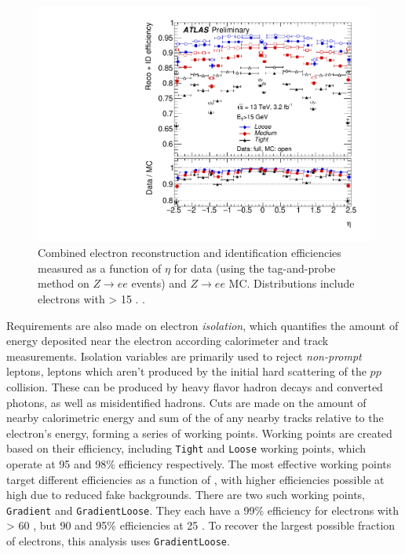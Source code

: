 \begin{centering}
\begin{figure}[!hbt]
\myfloatalign
\includegraphics[width=.90\linewidth]{figures/reco/fig_14b.pdf}
\caption{ Combined electron reconstruction and identification efficiencies measured as a function of $\eta$ for data (using the tag-and-probe method on $Z\rightarrow ee$ events) and $Z\rightarrow ee$ \ac{MC}. Distributions include electrons with \et > 15 \gev. \cite{ATLAS-CONF-2016-024}.}
\label{fig:reco_el_sf}
\end{figure}
\end{centering}

Requirements are also made on electron \textit{isolation}, which quantifies the amount of energy deposited near the electron according calorimeter and track measurements. Isolation variables are primarily used to reject \textit{non-prompt} leptons, leptons which aren't produced by the initial hard scattering of the $pp$ collision. These can be produced by heavy flavor hadron decays and converted photons, as well as misidentified hadrons. Cuts are made on the amount of nearby calorimetric energy and sum of the \pt of any nearby tracks relative to the electron's energy, forming a series of working points. Working points are created based on their efficiency, including \texttt{Tight} and \texttt{Loose} working points, which operate at 95 and 98\% efficiency respectively. The most effective working points target different efficiencies as a function of \pt, with higher efficiencies possible at high \pt due to reduced fake backgrounds. There are two such working points, \texttt{Gradient} and \texttt{GradientLoose}. They each have a 99\% efficiency for electrons with \pt > 60 \gev, but 90 and 95\% efficiencies at 25 \gev. To recover the largest possible fraction of electrons, this analysis uses \texttt{GradientLoose}.

